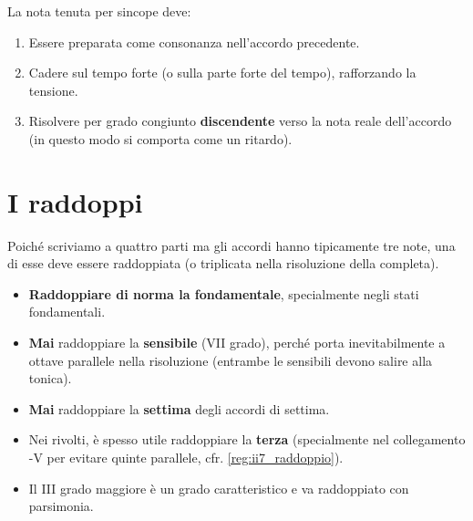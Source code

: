 \begin{regola}
	\label{reg:sincope_armonica}
	La nota tenuta per sincope deve:
	\begin{enumerate}
		\item Essere preparata come consonanza nell'accordo precedente.
		\item Cadere sul tempo forte (o sulla parte forte del tempo), rafforzando la tensione.
		\item Risolvere per grado congiunto \textbf{discendente} verso la nota reale dell'accordo (in questo modo si comporta come un ritardo).
	\end{enumerate}
\end{regola}

\section{I raddoppi}
\label{sec:raddoppi}

Poiché scriviamo a quattro parti ma gli accordi hanno tipicamente tre note, una di esse deve essere raddoppiata (o triplicata nella risoluzione della  completa).

\begin{regola}
	\label{reg:raddoppi}
	\begin{itemize}
		\item \textbf{Raddoppiare di norma la fondamentale}, specialmente negli stati fondamentali.
		\item \textbf{Mai} raddoppiare la \textbf{sensibile} (VII grado), perché porta inevitabilmente a ottave parallele nella risoluzione (entrambe le sensibili devono salire alla tonica).
		\item \textbf{Mai} raddoppiare la \textbf{settima} degli accordi di settima.
		\item Nei rivolti, è spesso utile raddoppiare la \textbf{terza} (specialmente nel collegamento -V per evitare quinte parallele, cfr. \ref{reg:ii7_raddoppio}).
		\item Il III grado maggiore è un grado caratteristico e va raddoppiato con parsimonia.
	\end{itemize}
\end{regola}

